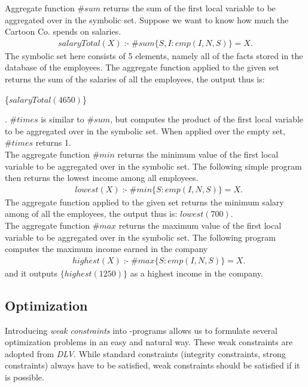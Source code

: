 \documentclass[14pt,a4paper, titlepage]{article}
\DeclareMathOperator{\leftimpl}{:-}
\begin{document}
\bigskip Aggregate function $\mathit{\#sum}$ returns the sum of the first local variable to be aggregated over in the symbolic set. Suppose we want to know how much the Cartoon Co. spends on salaries.
\begin{align*}
\mathit{salaryTotal(X)} \leftimpl \mathit{\#sum}\{S,I : \mathit{emp(I,N,S)}\} = X.
\end{align*}
The symbolic set here consists of 5 elements, namely all of the facts stored in the database of the employees. The aggregate function applied to the given set returns the sum of the salaries of all the employees, the output thus is: \\ \centerline{
\{$\mathit{salaryTotal(4650)}$\}}. $\mathit{\#times}$ is similar to $\mathit{\#sum}$, but computes the product of the first local variable to be aggregated over in the symbolic set. When applied over the empty set, $\mathit{\#times}$ returns 1.
\bigskip \\The aggregate function $\mathit{\#min}$ returns the minimum value of the first local variable to be aggregated over in the symbolic set. The following simple program then returns the lowest income among all employees.
\begin{align*}
& lowest(X) \leftimpl \#min\{S : emp(I,N,S)\} = X.
\end{align*}
The aggregate function applied to the given set returns the minimum salary among of all the employees, the output thus is:
{$\mathit{lowest(700)}$}.
\bigskip \\The aggregate function $\mathit{\#max}$ returns the maximum value of the first local variable to be aggregated over in the symbolic set. The following program computes the maximum income earned in the company
\begin{align*}
& \mathit{highest}(X) \leftimpl \mathit{\#max}\{S : \mathit{emp}(I,N,S)\} = X.
\end{align*}
and it outputs $\{highest(1250)\}$ as a highest income in the company.

\subsection{Optimization}
Introducing \emph{weak constraints} into \hex-programs allows us to formulate several optimization problems in an easy and natural way. These weak constraints are adopted from \emph{DLV}. While standard constraints (integrity constraints, strong constraints) always have to be satisfied, weak constraints should be satisfied if it is possible.
\end{document}

